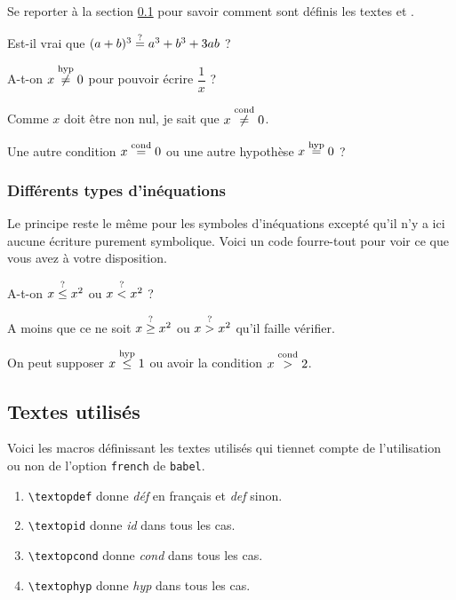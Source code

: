 \documentclass[12pt,a4paper]{article}
\theoremstyle{definition}
\begin{document}
Se reporter à la section \ref{text-for-opes} pour savoir comment sont définis les textes \emph{\og \textopcond \fg} et \emph{\og \textophyp \fg}.

\begin{tcblisting}{}
Est-il vrai que $(a + b)^3 \eqtest a^3 + b^3 + 3 a b$ ?

A-t-on $x \neqhyp 0$ pour pouvoir écrire $\dfrac{1}{x}$ ?

Comme $x$ doit être non nul, je sait que $x \neqcond 0$.

Une autre condition $x \eqcond 0$ ou une autre hypothèse $x \eqhyp 0$ ?
\end{tcblisting}



	    \subsubsection{Différents types d'inéquations}
    
Le principe reste le même pour les symboles d'inéquations excepté qu'il n'y a ici aucune écriture purement symbolique. Voici un code \og fourre-tout \fg{} pour voir ce que vous avez à votre disposition.

\begin{tcblisting}{}
A-t-on $x \leqtest x^2$ ou $x \ltest x^2$ ?

A moins que ce ne soit $x \geqtest x^2$ ou $x \gtest x^2$ qu'il faille vérifier.

On peut supposer $x \leqhyp 1$ ou avoir la condition $x \gcond 2$.

\end{tcblisting}


		\subsection{Textes utilisés} \label{text-for-opes}

Voici les macros définissant les textes utilisés qui tiennet compte de l'utilisation ou non de l'option \verb+french+ de \verb+babel+.

\begin{enumerate}
	\item \verb+\textopdef+ donne \emph{\og déf \fg} en français et \emph{\og def \fg} sinon. 

	\item \verb+\textopid+ donne \emph{\og id \fg} dans tous les cas.

	\item \verb+\textopcond+ donne \emph{\og cond \fg} dans tous les cas.

	\item \verb+\textophyp+ donne \emph{\og hyp \fg} dans tous les cas.
\end{enumerate}
\end{document}
